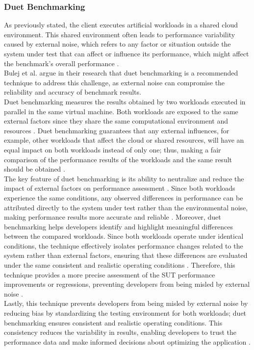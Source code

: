 \subsubsection{Duet Benchmarking}
\label{sec:duet_benchmarking}
As previously stated, the client executes artificial workloads in a shared cloud environment. This shared environment often leads to performance variability caused by external noise, which refers to any factor or situation outside the system under test that can affect or influence its performance, which might affect the benchmark’s overall performance \cite{japke2023earlymicrobenchmarkcatches, bulej2020duet}. \\
Bulej et al. \cite{bulej2019initial} argue in their research that duet benchmarking is a recommended technique to address this challenge, as external noise can compromise the reliability and accuracy of benchmark results. \\
Duet benchmarking measures the results obtained by two workloads executed in parallel in the same virtual machine. Both workloads are exposed to the same external factors since they share the same computational environment and resources \cite{bulej2019initial, bulej2020duet, grambow}. Duet benchmarking guarantees that any external influences, for example, other workloads that affect the cloud or shared resources, will have an equal impact on both workloads instead of only one; thus, making a fair comparison of the performance results of the workloads and the same result should be obtained \cite{bulej2019initial, bulej2020duet}. \\
The key feature of duet benchmarking is its ability to neutralize and reduce the impact of external factors on performance assessment \cite{bulej2019initial}. Since both workloads experience the same conditions, any observed differences in performance can be attributed directly to the system under test rather than the environmental noise, making performance results more accurate and reliable \cite{bulej2019initial, bulej2020duet}. Moreover, duet benchmarking helps developers identify and highlight meaningful differences between the compared workloads. Since both workloads operate under identical conditions, the technique effectively isolates performance changes related to the system rather than external factors, ensuring that these differences are evaluated under the same consistent and realistic operating conditions \cite{bulej2020duet}. Therefore, this technique provides a more precise assessment of the \ac{SUT} performance improvements or regressions, preventing developers from being misled by external noise \cite{japke2023earlymicrobenchmarkcatches}. \\
Lastly, this technique prevents developers from being misled by external noise by reducing bias by standardizing the testing environment for both workloads; duet benchmarking ensures consistent and realistic operating conditions. This consistency reduces the variability in results, enabling developers to trust the performance data and make informed decisions about optimizing the application \cite{bulej2020duet, bulej2019initial, japke2023earlymicrobenchmarkcatches}.

